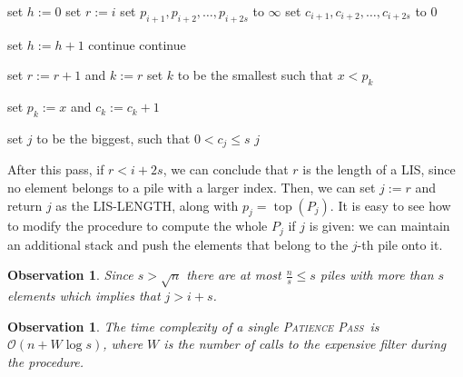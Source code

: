 \documentclass[lic, english, shortabstract]{iithesis}
\theoremstyle{plain}
\newcommand{\Lis}{\textsc{LIS}}
\newcommand{\LisLen}{\textsc{LIS-LENGTH}}
\newcommand{\Ppass}{\textsc{Patience Pass}}
\newtheorem{observation}[theorem]{Observation}
\theoremstyle{definition}
\begin{document}
\begin{algorithm}
    \caption{First pass in \Ppass, assume $P_i$ is given, and $|P_i| < s$}
    \begin{algorithmic}[1]
    \State set $h := 0$ 
    \State set $r := i$ \Comment{\textcolor{gray}{Is the index of the current rightmost pile}}
    \State set $p_{i+1}, p_{i+2}, \ldots, p_{i+2s}$ to $\infty$ 
    \State set $c_{i+1}, c_{i+2}, \ldots, c_{i+2s}$ to $0$ \Comment{\textcolor{gray}{$c_k$ is the current size of $P_k$}}

         \Comment{\textcolor{gray}{$x$ is the next element in $P_i$}}
            \State set $h := h + 1$ 
            \State continue
         \Comment{\textcolor{gray}{$x$ belongs to the $P_k$ where $k < i \vee k > i+2s$}}
            \State continue
        \EndIf

            \State set $r := r + 1$ and $k := r$
        \Else
            \State set $k$ to be the smallest such that $x < p_k$
        \EndIf
            
        \State set $p_k := x$ and $c_k := c_k + 1$
    \EndFor
    
    \State set $j$ to be the biggest, such that $0 < c_j \leq s$
    \State \Return $j$
    \end{algorithmic}
\end{algorithm}

After this pass, if $r < i + 2s$, we can conclude that $r$ is the length of a \Lis, since no element belongs to a pile with a larger index.
Then, we can set $j := r$ and return $j$ as the \LisLen, along with $p_j = \operatorname{top}(P_j)$. 
It is easy to see how to modify the procedure to compute the whole $P_j$ if $j$ is given: we can maintain an additional stack and push the elements that belong to the $j$-th pile onto it.

\begin{observation} \label{obs:ppass-advance}
Since $s > \sqrt{n}$ there are at most $\frac{n}{s} \leq s$ piles with more than $s$ elements which implies that $j > i + s$.
\end{observation}

\begin{observation} \label{obs:ppass-time}
The time complexity of a single \Ppass\ is $\mathcal{O}(n + W \log s )$, where $W$ is the number of calls to the expensive filter during the procedure.
\end{observation}
\end{document}
